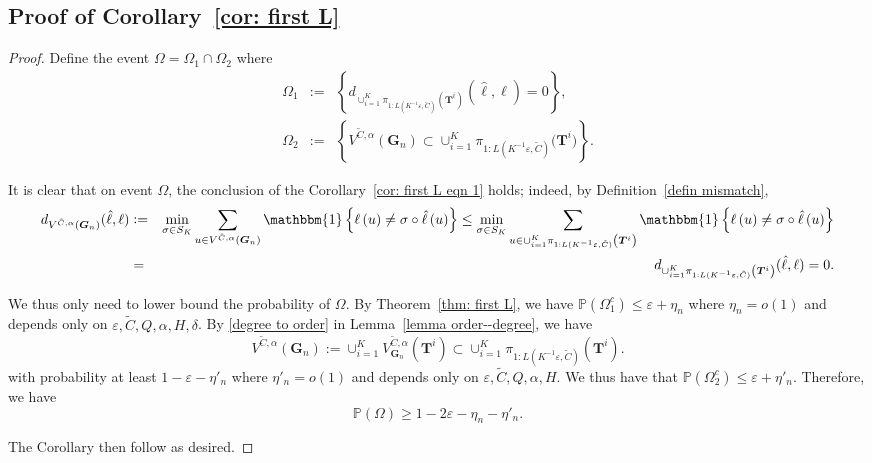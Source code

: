 \documentclass[twoside,11pt]{article}
\theoremstyle{remark}
\begin{document}
\subsection{Proof of Corollary~\ref{cor: first L}}
\begin{proof}

Define the event $\Omega = \Omega_1 \cap \Omega_2$ where
\begin{eqnarray*}
 \Omega_1 &:=&\left\{d_{\cup_{i=1}^K \pi_{1:L(K^{-1}\varepsilon, \tilde{C})}\left(\bm{T}^i\right)}(\hat{\ell}, \ell) = 0\right\},\\  
 \Omega_2 &:= &\left\{V^{\tilde{C}, \alpha}\left(\bm{G}_n\right) \subset  \cup_{i=1}^K \pi_{1:L(K^{-1}\varepsilon, \tilde{C})}\bigl(\bm{T}^i\bigr)\right\}.
 \end{eqnarray*}

It is clear that on event $\Omega$, the conclusion of the Corollary~\eqref{cor: first L eqn 1} holds; indeed, by Definition~\ref{defin mismatch},
%
\begingroup
\begin{eqnarray*}
d_{V^{\tilde{C}, \alpha}\left(\bm{G}_n\right)}(\hat{\ell}, \ell)
&:=& 
\min_{\sigma \in S_K} \sum_{u\in V^{\tilde{C}, \alpha}\left(\bm{G}_n\right) }\mathbbm{1}\left\{{\ell} \left(u\right)\neq \sigma\circ \hat{\ell} \left(u\right)\right\}
\le \min_{\sigma \in S_K} \sum_{u\in \cup_{i=1}^K \pi_{1:L(K^{-1}\varepsilon, \tilde{C})}\left(\bm{T}^i\right) }\mathbbm{1}\left\{{\ell} \left(u\right)\neq \sigma\circ \hat{\ell} \left(u\right)\right\}\\
%
& = & d_{\cup_{i=1}^K \pi_{1:L(K^{-1}\varepsilon, \tilde{C})}\left(\bm{T}^i\right)}(\hat{\ell}, \ell)=0.
\end{eqnarray*}
\endgroup

We thus only need to lower bound the probability of $\Omega$. By Theorem~\ref{thm: first L}, we have $\mathbb{P}(\Omega_1^c)\le \varepsilon + \eta_n$ where $\eta_n = o(1)$ and depends only on $\varepsilon, \tilde{C}, Q, \alpha, H, \delta$.
By \eqref{degree to order} in Lemma~\ref{lemma order--degree}, we have 
%
\begin{equation*}
V^{\tilde{C}, \alpha}\left(\bm{G}_n\right):= \cup_{i=1}^K V_{\bm G_n}^{\tilde{C}, \alpha}\left(\bm{T}^i\right)\subset \cup_{i=1}^K \pi_{1:L\left(K^{-1}\varepsilon, \tilde{C}\right)}\left(\bm{T}^i\right).    
\end{equation*}
%
with probability at least $1-\varepsilon-\eta'_n$ where $\eta'_n = o(1)$ and depends only on $\varepsilon, \tilde{C}, Q, \alpha, H$. We thus have that $\mathbb{P}(\Omega_2^c) \leq \varepsilon + \eta'_n$. Therefore, we have
%
\begin{equation*}
\mathbb{P}\left(\Omega\right) \geq 1 - 2 \varepsilon - \eta_n - \eta'_n.
\end{equation*}

The Corollary then follow as desired.

\end{proof}
\end{document}
